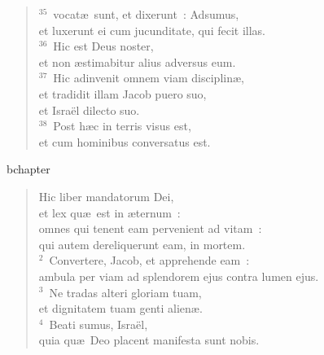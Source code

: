 \begin{flushleft}
\begin{verse}
${}^{35}$~vocat\ae\ sunt, et dixerunt~: Adsumus,\\ et luxerunt ei cum jucunditate, qui fecit illas.\\
${}^{36}$~Hic est Deus noster,\\ et non \ae stimabitur alius adversus eum.\\
${}^{37}$~Hic adinvenit omnem viam disciplin\ae ,\\ et tradidit illam Jacob puero suo,\\ et Isra\"el dilecto suo.\\
${}^{38}$~Post h\ae c in terris visus est,\\ et cum hominibus conversatus est.\end{verse}\end{flushleft}


bchapter\begin{flushleft}\begin{verse}\vspace{-19pt}Hic liber mandatorum Dei,\\ et lex qu\ae\ est in \ae ternum~:\\ omnes qui tenent eam pervenient ad vitam~:\\ qui autem dereliquerunt eam, in mortem.\\
${}^{2}$~Convertere, Jacob, et apprehende eam~:\\ ambula per viam ad splendorem ejus contra lumen ejus.\\
${}^{3}$~Ne tradas alteri gloriam tuam,\\ et dignitatem tuam genti alien\ae .\\
${}^{4}$~Beati sumus, Isra\"el,\\ quia qu\ae\ Deo placent manifesta sunt nobis.\end{verse}\end{flushleft}


